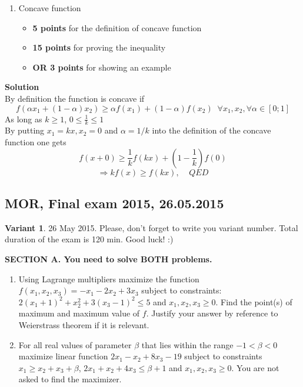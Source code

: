 \documentclass[12pt]{article} %
\theoremstyle{definition} %
\begin{document}
\begin{enumerate}
\item Concave function
\begin{itemize}
    \item \textbf{5 points} for the definition of concave function
    \item \textbf{15 points} for proving the inequality
    \item \textbf{OR 3 points} for showing an example
\end{itemize}
\end{enumerate}

\textbf{Solution} \\
By definition the function is concave if
\[
f(\alpha x_1+(1-\alpha) x_2) \geq \alpha f(x_1)+(1-\alpha) f(x_2) \;\; \forall x_1,x_2, \forall \alpha \in [0;1]
\]
As long as $k\geq 1$, $0\leq \frac 1 k \leq 1$\\
By putting $x_1=kx, x_2=0$ and $\alpha = 1/k$ into the definition of the concave function one gets
\[
f(x + 0) \geq \frac 1 k f(kx) +(1-\frac 1 k) f(0)
\]
\[
\Longrightarrow kf(x) \geq f(kx), \;\;\;\; QED
\]


\subsection{MOR, Final exam 2015, 26.05.2015}

\textbf{Variant 1}. 26 May 2015. Please, don't forget to write you variant number. Total duration of the exam is 120 min. Good luck! :)

\vspace{0.6cm}

\textbf{SECTION A. You need to solve BOTH problems.}

\begin{enumerate}

\item Using Lagrange multipliers maximize  the function $f(x_1,x_2,x_3)=-x_1-2x_2+3x_3$ subject to constraints:   $2(x_1+1)^2+x_2^2+3(x_3-1)^2\leq 5$ and $x_1, x_2, x_3 \geq 0$. Find the point(s) of maximum and maximum value of $f$. Justify your answer by reference to Weierstrass theorem if it is relevant.

\item For all real values of parameter $\beta$ that lies within the range $-1<\beta<0$ maximize linear function $2x_1-x_2+8x_3-19$ subject to constraints  $x_1\geq x_2+x_3+\beta$,  $2x_1+x_2+4x_3\leq \beta+1$ and $x_1, x_2, x_3 \geq 0$. You are not asked to find the maximizer.

\end{enumerate}
\end{document}
